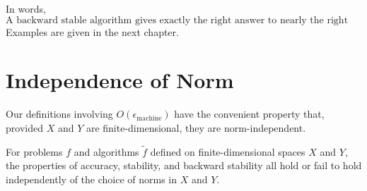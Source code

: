 In words, 
\[
    \text{A backward stable algorithm gives exactly the right answer to nearly the right question.}
\]
Examples are given in the next chapter.   

\section{Independence of Norm}
Our definitions involving $O\left(\epsilon_{\text {machine}}\right)$ have the convenient property that, provided $X$ and $Y$ are finite-dimensional, they are norm-independent. 


\begin{theorem}
\label{thm: indep of norm}
For problems $f$ and algorithms $\tilde{f}$ defined on finite-dimensional spaces $X$ and $Y$, the properties of accuracy, stability, and backward stability all hold or fail to hold independently of the choice of norms in $X$ and $Y$.
\end{theorem}


